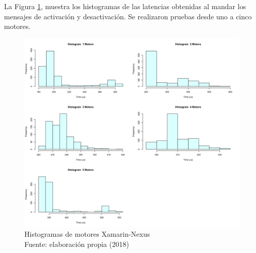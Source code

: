 La Figura \ref{fig:xamarin-nexus-hist-motors}, muestra los histogramas de las latencias obtenidas al mandar los mensajes de activación y desactivación. Se realizaron pruebas desde uno a cinco motores.

\begin{figure}
 \begin{center} 
   	\includegraphics[width=1.0\textwidth]{evaluation/graphics/Xamarin/Nexus/HistMotorsXamarinNexus.png} 
    \caption[Histogramas de motores Xamarin-Nexus]{Histogramas de motores  Xamarin-Nexus\\Fuente: elaboración propia (2018)} 
    \label{fig:xamarin-nexus-hist-motors}
  \end{center}
\end{figure}


